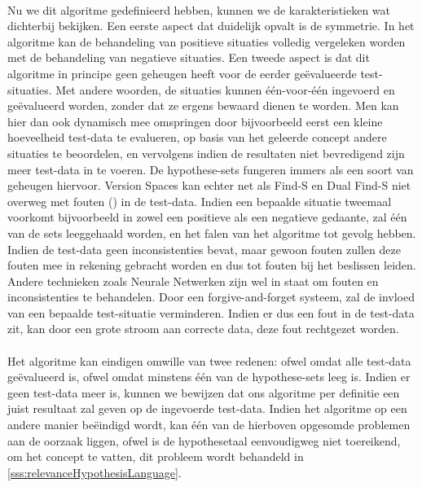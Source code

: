 \paragraph{}
Nu we dit algoritme gedefinieerd hebben, kunnen we de karakteristieken wat dichterbij bekijken. Een eerste aspect dat duidelijk opvalt is de symmetrie. In het algoritme kan de behandeling van positieve situaties volledig vergeleken worden met de behandeling van negatieve situaties. Een tweede aspect is dat dit algoritme in principe geen geheugen heeft voor de eerder ge\"evalueerde test-situaties. Met andere woorden, de situaties kunnen \'e\'en-voor-\'e\'en ingevoerd en ge\"evalueerd worden, zonder dat ze ergens bewaard dienen te worden. Men kan hier dan ook dynamisch mee omspringen door bijvoorbeeld eerst een kleine hoeveelheid test-data te evalueren, op basis van het geleerde concept andere situaties te beoordelen, en vervolgens indien de resultaten niet bevredigend zijn meer test-data in te voeren. De hypothese-sets fungeren immers als een soort van geheugen hiervoor. Version Spaces kan echter net als Find-S en Dual Find-S niet overweg met fouten () in de test-data. Indien een bepaalde situatie tweemaal voorkomt bijvoorbeeld in zowel een positieve als een negatieve gedaante, zal \'e\'en van de sets leeggehaald worden, en het falen van het algoritme tot gevolg hebben. Indien de test-data geen inconsistenties bevat, maar gewoon fouten zullen deze fouten mee in rekening gebracht worden en dus tot fouten bij het beslissen leiden. Andere technieken zoals Neurale Netwerken zijn wel in staat om fouten en inconsistenties te behandelen. Door een forgive-and-forget systeem, zal de invloed van een bepaalde test-situatie verminderen. Indien er dus een fout in de test-data zit, kan door een grote stroom aan correcte data, deze fout rechtgezet worden.
\paragraph{}
Het algoritme kan eindigen omwille van twee redenen: ofwel omdat alle test-data ge\"evalueerd is, ofwel omdat minstens \'e\'en van de hypothese-sets leeg is. Indien er geen test-data meer is, kunnen we bewijzen dat ons algoritme per definitie een juist resultaat zal geven op de ingevoerde test-data. Indien het algoritme op een andere manier be\"eindigd wordt, kan \'e\'en van de hierboven opgesomde problemen aan de oorzaak liggen, ofwel is de hypothesetaal eenvoudigweg niet toereikend, om het concept te vatten, dit probleem wordt behandeld in \ref{sss:relevanceHypothesisLanguage}.
